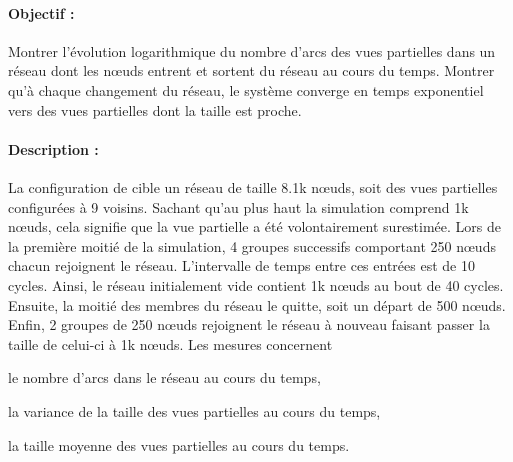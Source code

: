 \paragraph{Objectif :} Montrer l'évolution logarithmique du nombre d'arcs des
vues partielles dans un réseau dont les nœuds entrent et sortent du réseau au
cours du temps. Montrer qu'à chaque changement du réseau, le système converge en
temps exponentiel vers des vues partielles dont la taille est proche.

\paragraph{Description :} La configuration de \CYCLON cible un réseau de taille
8.1k nœuds, soit des vues partielles configurées à 9 voisins. Sachant qu'au plus
haut la simulation comprend 1k nœuds, cela signifie que la vue partielle a été
volontairement surestimée. Lors de la première moitié de la simulation, 4
groupes successifs comportant 250 nœuds chacun rejoignent le
réseau. L'intervalle de temps entre ces entrées est de 10 cycles. Ainsi, le
réseau initialement vide contient 1k nœuds au bout de 40 cycles. Ensuite, la
moitié des membres du réseau le quitte, soit un départ de 500 nœuds. Enfin, 2
groupes de 250 nœuds rejoignent le réseau à nouveau faisant passer la taille de
celui-ci à 1k nœuds. Les mesures concernent
\begin{inparaenum}[(i)]
\item le nombre d'arcs dans le réseau au cours du temps,
\item la variance de la taille des vues partielles au cours du temps,
\item la taille moyenne des vues partielles au cours du temps.
\end{inparaenum}

